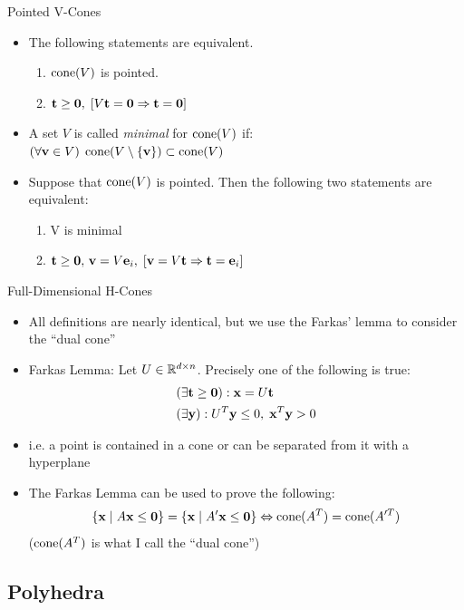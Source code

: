\documentclass{beamer}
\begin{document}
\begin{frame}{Pointed V-Cones}
\begin{itemize}
  \item<1-> The following statements are equivalent.
    \begin{enumerate}
      \item $\operatorname{cone}(V)$ is pointed.
      \item $\mathbf{t}\geq\mathbf{0},\; [V\mathbf{t}=\mathbf{0} \Rightarrow \mathbf{t}=\mathbf{0}]$
    \end{enumerate}

  \item<2-> A set $V$ is called \textit{minimal} for $\operatorname{cone}(V)$ if:\\
  $(\forall \mathbf{v} \in V)\; \operatorname{cone}(V\setminus\{\mathbf{v}\}) \subset \operatorname{cone}(V)$

	\item<3-> Suppose that $\operatorname{cone}(V)$ is pointed.  Then the following two statements are equivalent:
	\begin{enumerate}
		\item V is minimal
		\item $\mathbf{t}\geq\mathbf{0},\,\mathbf{v}=V\mathbf{e}_i,\; [\mathbf{v}=V\mathbf{t} \Rightarrow \mathbf{t}=\mathbf{e}_i]$
	\end{enumerate}
\end{itemize}
\end{frame}

\begin{frame}{Full-Dimensional H-Cones}
\begin{itemize}
  \item<1-> All definitions are nearly identical, but we use the Farkas' lemma to consider the ``dual cone''
  \item<2-> Farkas Lemma:
    Let $U \in \mathbb{R}^{d\times n}$.  Precisely one of the following is true:
    \begin{align*}
       & (\exists \mathbf{t} \geq \mathbf{0}) : \mathbf{x} = U\mathbf{t}                \\
       & (\exists \mathbf{y}) : U^T\mathbf{y} \leq 0,\; \mathbf{x}^T \mathbf{y} > 0
    \end{align*}
  \item<3-> i.e. a point is contained in a cone or can be separated from it with a hyperplane
  \item<4-> The Farkas Lemma can be used to prove the following: 
    \[\left\{\mathbf{x}\;|\; A\mathbf{x}\leq\mathbf{0}\right\} = \left\{\mathbf{x}\;|\; A'\mathbf{x}\leq\mathbf{0}\right\} \Leftrightarrow \operatorname{cone}(A^T) = \operatorname{cone}(A'^T)\]
    ($\operatorname{cone}(A^T)$ is what I call the ``dual cone'')
\end{itemize}
\end{frame}

\subsection{Polyhedra}
\end{document}
